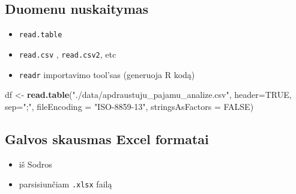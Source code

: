 \documentclass[]{article}
\newenvironment{Shaded}{\begin{snugshade}}{\end{snugshade}}
\newcommand{\KeywordTok}[1]{\textcolor[rgb]{0.13,0.29,0.53}{\textbf{#1}}}
\newcommand{\DataTypeTok}[1]{\textcolor[rgb]{0.13,0.29,0.53}{#1}}
\newcommand{\StringTok}[1]{\textcolor[rgb]{0.31,0.60,0.02}{#1}}
\newcommand{\OtherTok}[1]{\textcolor[rgb]{0.56,0.35,0.01}{#1}}
\newcommand{\NormalTok}[1]{#1}
\providecommand{\tightlist}{%
  \setlength{\itemsep}{0pt}\setlength{\parskip}{0pt}}
\begin{document}
\subsection{Duomenu nuskaitymas}\label{duomenu-nuskaitymas}

\begin{itemize}
\tightlist
\item
  \texttt{read.table}
\item
  \texttt{read.csv} , \texttt{read.csv2}, etc
\item
  \texttt{readr} importavimo tool'sas (generuoja R kodą)
\end{itemize}

\begin{Shaded}
\begin{Highlighting}[]
\NormalTok{df <-}\StringTok{ }\KeywordTok{read.table}\NormalTok{(}\StringTok{"./data/apdraustuju_pajamu_analize.csv"}\NormalTok{,}
                 \DataTypeTok{header=}\OtherTok{TRUE}\NormalTok{,}
                 \DataTypeTok{sep=}\StringTok{";"}\NormalTok{,}
                 \DataTypeTok{fileEncoding =} \StringTok{"ISO-8859-13"}\NormalTok{,}
                 \DataTypeTok{stringsAsFactors =} \OtherTok{FALSE}\NormalTok{) }
\end{Highlighting}
\end{Shaded}

\subsection{Galvos skausmas Excel
formatai}\label{galvos-skausmas-excel-formatai}

\begin{itemize}
\tightlist
\item
  iš Sodros
\item
  parsisiunčiam \texttt{.xlsx} failą
\end{itemize}

\begin{Shaded}
\end{Shaded}
\end{document}
